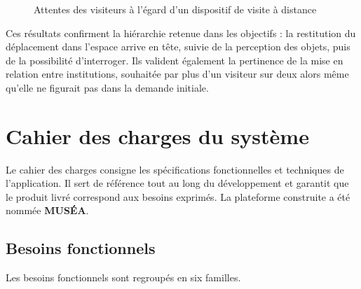 \begin{figure}[htbp]
\centering
{}
\caption{Attentes des visiteurs à l'égard d'un dispositif de visite à distance}
\label{fig:attentes}
\end{figure}

Ces résultats confirment la hiérarchie retenue dans les objectifs : la
restitution du déplacement dans l'espace arrive en tête, suivie de la perception
des objets, puis de la possibilité d'interroger. Ils valident également la
pertinence de la mise en relation entre institutions, souhaitée par plus d'un
visiteur sur deux alors même qu'elle ne figurait pas dans la demande initiale.

\section{Cahier des charges du système}
\label{sec:cdc}

Le cahier des charges consigne les spécifications fonctionnelles et techniques
de l'application. Il sert de référence tout au long du développement et
garantit que le produit livré correspond aux besoins exprimés. La plateforme
construite a été nommée \textbf{MUSÉA}.

\subsection{Besoins fonctionnels}

Les besoins fonctionnels sont regroupés en six familles.

